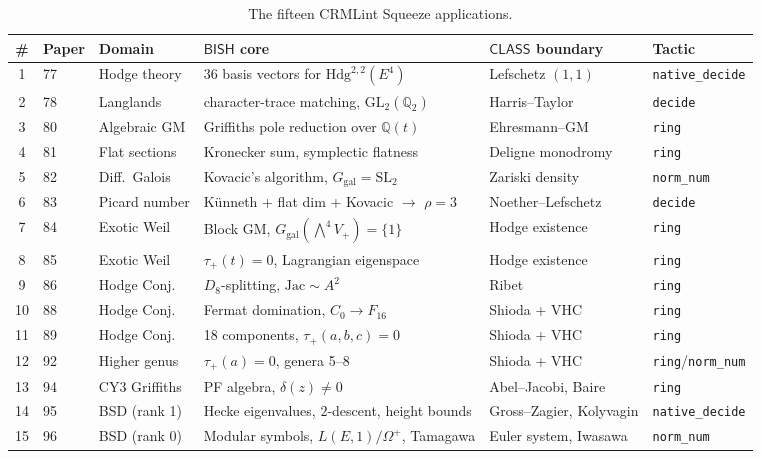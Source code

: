 \documentclass[11pt]{article}
\theoremstyle{plain}
\theoremstyle{definition}
\theoremstyle{remark}
\newcommand{\QQ}{\mathbb{Q}}
\newcommand{\SL}{\mathrm{SL}}
\newcommand{\GL}{\mathrm{GL}}
\newcommand{\Jac}{\mathrm{Jac}}
\newcommand{\Hdg}{\mathrm{Hdg}}
\newcommand{\BISH}{\mathsf{BISH}}
\newcommand{\CLASS}{\mathsf{CLASS}}
\begin{document}
\begin{table}[ht]
\centering
\small
\caption{The fifteen CRMLint Squeeze applications.}\label{tab:squeeze-applications}
\begin{tabular}{@{}clllll@{}}
\toprule
\# & Paper & Domain & $\BISH$ core & $\CLASS$ boundary & Tactic \\
\midrule
1 & 77 & Hodge theory & 36 basis vectors for $\Hdg^{2,2}(E^4)$ & Lefschetz $(1,1)$ & \texttt{native\_decide} \\
2 & 78 & Langlands & character-trace matching, $\GL_2(\QQ_2)$ & Harris--Taylor & \texttt{decide} \\
3 & 80 & Algebraic GM & Griffiths pole reduction over $\QQ(t)$ & Ehresmann--GM & \texttt{ring} \\
4 & 81 & Flat sections & Kronecker sum, symplectic flatness & Deligne monodromy & \texttt{ring} \\
5 & 82 & Diff.\ Galois & Kovacic's algorithm, $G_{\mathrm{gal}} = \SL_2$ & Zariski density & \texttt{norm\_num} \\
6 & 83 & Picard number & K\"unneth + flat dim + Kovacic $\to$ $\rho = 3$ & Noether--Lefschetz & \texttt{decide} \\
7 & 84 & Exotic Weil & Block GM, $G_{\mathrm{gal}}(\bigwedge^4 V_+) = \{1\}$ & Hodge existence & \texttt{ring} \\
8 & 85 & Exotic Weil & $\tau_+(t) = 0$, Lagrangian eigenspace & Hodge existence & \texttt{ring} \\
9 & 86 & Hodge Conj. & $D_8$-splitting, $\Jac \sim A^2$ & Ribet & \texttt{ring} \\
10 & 88 & Hodge Conj. & Fermat domination, $C_0 \to F_{16}$ & Shioda + VHC & \texttt{ring} \\
11 & 89 & Hodge Conj. & 18 components, $\tau_+(a,b,c) = 0$ & Shioda + VHC & \texttt{ring} \\
12 & 92 & Higher genus & $\tau_+(a) = 0$, genera 5--8 & Shioda + VHC & \texttt{ring}/\texttt{norm\_num} \\
13 & 94 & CY3 Griffiths & PF algebra, $\delta(z) \neq 0$ & Abel--Jacobi, Baire & \texttt{ring} \\
14 & 95 & BSD (rank 1) & Hecke eigenvalues, $2$-descent, height bounds & Gross--Zagier, Kolyvagin & \texttt{native\_decide} \\
15 & 96 & BSD (rank 0) & Modular symbols, $L(E,1)/\Omega^+$, Tamagawa & Euler system, Iwasawa & \texttt{norm\_num} \\
\bottomrule
\end{tabular}
\end{table}
\end{document}

